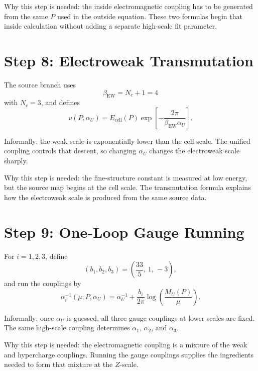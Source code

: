 \documentclass[11pt]{article}
\theoremstyle{remark}
\newcommand{\Nc}{N_c}
\begin{document}
Why this step is needed: the inside electromagnetic coupling has to be generated from the same \(P\) used in the outside equation. These two formulas begin that inside calculation without adding a separate high-scale fit parameter.

\section{Step 8: Electroweak Transmutation}

The source branch uses
\begin{equation}
\beta_{\mathrm{EW}}=\Nc+1=4
\end{equation}
with \(\Nc=3\), and defines
\begin{equation}
v(P,\alpha_U)
=
E_{\mathrm{cell}}(P)
\exp\!\left[-\frac{2\pi}{\beta_{\mathrm{EW}}\alpha_U}\right].
\label{eq:v}
\end{equation}

Informally: the weak scale is exponentially lower than the cell scale. The unified coupling controls that descent, so changing \(\alpha_U\) changes the electroweak scale sharply.

Why this step is needed: the fine-structure constant is measured at low energy, but the source map begins at the cell scale. The transmutation formula explains how the electroweak scale is produced from the same source data.

\section{Step 9: One-Loop Gauge Running}

For \(i=1,2,3\), define
\begin{equation}
(b_1,b_2,b_3)=\left(\frac{33}{5},\,1,\,-3\right),
\label{eq:b}
\end{equation}
and run the couplings by
\begin{equation}
\alpha_i^{-1}(\mu;P,\alpha_U)
=
\alpha_U^{-1}
+ 
\frac{b_i}{2\pi}\log\!\left(\frac{M_U(P)}{\mu}\right).
\label{eq:running}
\end{equation}

Informally: once \(\alpha_U\) is guessed, all three gauge couplings at lower scales are fixed. The same high-scale coupling determines \(\alpha_1\), \(\alpha_2\), and \(\alpha_3\).

Why this step is needed: the electromagnetic coupling is a mixture of the weak and hypercharge couplings. Running the gauge couplings supplies the ingredients needed to form that mixture at the \(Z\)-scale.
\end{document}
